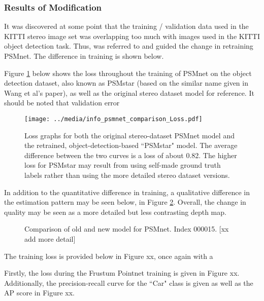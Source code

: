\subsubsection{Results of Modification}
It was discovered at some point that the training / validation data used in the KITTI stereo image set was overlapping too much with images used in the KITTI object detection task. Thus, \cite{wang_pseudo-lidar_2019} was referred to and guided the change in retraining PSMnet. The difference in training is shown below.

Figure \ref{psmnet_star_train_info} below shows the loss throughout the training of PSMnet on the object detection dataset, also known as PSMstar (based on the similar name given in Wang et al's paper), as well as the original stereo dataset model for reference. It should be noted that validation error



\begin{figure}[ht]
	\centering
	\texttt{[image: ../media/info\_psmnet\_comparison\_Loss.pdf]}
	\caption{Loss graphs for both the original stereo-dataset PSMnet model and the retrained, object-detection-based ``PSMstar" model. The average difference between the two curves is a loss of about 0.82. The higher loss for PSMstar may result from using self-made ground truth labels rather than using the more detailed stereo dataset versions.}
	\label{psmnet_star_train_info}
\end{figure}

In addition to the quantitative difference in training, a qualitative difference in the estimation pattern may be seen below, in Figure \ref{new_psmnet}. Overall, the change in quality may be seen as a more detailed but less contrasting depth map.

\begin{figure}[ht]
	\centering
	\caption{Comparison of old and new model for PSMnet. Index 000015. [xx add more detail]}
	\label{new_psmnet}
\end{figure}


The training loss is provided below in Figure xx, once again with a 


Firstly, the loss during the Frustum Pointnet training is given in Figure xx. Additionally, the precision-recall curve for the ``Car" class is given as well as the AP score in Figure xx.

